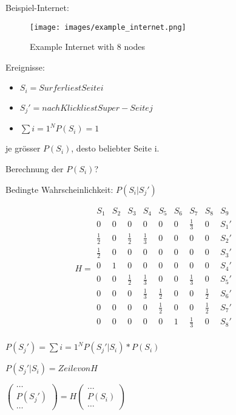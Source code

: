 \documentclass[10pt,a4paper]{scrartcl}
\begin{document}
Beispiel-Internet:
\begin{figure}
    \centering
    \texttt{[image: images/example\_internet.png]}
    \caption{Example Internet with 8 nodes}
    \label{fig:awesome_image}
\end{figure}

Ereignisse:
\begin{itemize}
\item $S_{i} = {Surfer liest Seite i}$
\item $S_{j}' = {nach Klick liest Super-Seite j}$
\item $\sum\limits{i=1}^N P(S_{i}) = 1$
\end{itemize}
je grösser $P(S_{i})$, desto beliebter Seite i.

Berechnung der $P(S_{i})$?

Bedingte Wahrscheinlichkeit: $P(S_{i}|S_{j}')$

$$H = 
\begin{matrix}
  S_{1} & S_{2} & S_{3} & S_{4} & S_{5} & S_{6} & S_{7} & S_{8} & S_{9} &  \\
  0 & 0 & 0 & 0 & 0 & 0 & \frac{1}{3} & 0 & S_{1}' \\
  \frac{1}{2} & 0 & \frac{1}{2} & \frac{1}{3} & 0 & 0 & 0 & 0 & S_{2}' \\
  \frac{1}{2} & 0 & 0 & 0 & 0 & 0 & 0 & 0 & S_{3}' \\
  0 & 1 & 0 & 0 & 0 & 0 & 0 & 0 & S_{4}' \\
  0 & 0 & \frac{1}{2} & \frac{1}{3} & 0 & 0 & \frac{1}{3} & 0 & S_{5}' \\
  0 & 0 & 0 & \frac{1}{3} & \frac{1}{2} & 0 & 0 & \frac{1}{2} & S_{6}' \\
  0 & 0 & 0 & 0 & \frac{1}{2} & 0 & 0 & \frac{1}{2} & S_{7}' \\
  0 & 0 & 0 & 0 & 0 & 1 & \frac{1}{3} & 0 & S_{8}' \\
\end{matrix}$$

$P(S_{j}') = \sum\limits{i=1}^N P(S_{j}'|S_{i}) * P(S_{i})$

$P(S_{j}'|S_{i}) = Zeile von H$

$\begin{pmatrix}
\dots \\
P(S_{j}') \\
\dots
\end{pmatrix} = H \begin{pmatrix}
\dots \\
P(S_{i}) \\
\dots
\end{pmatrix}$
\end{document}
